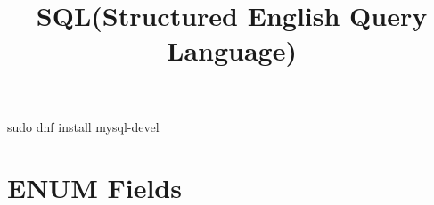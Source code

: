 \documentclass{article}
\begin{document}
	\title{SQL(Structured English Query Language)}
	\maketitle
	\pagebreak
	\tableofcontents
	sudo dnf install mysql-devel
	
	\section{ENUM Fields}
	
\end{document}
